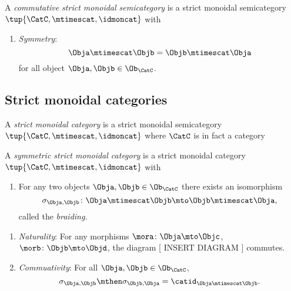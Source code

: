 {    \begin{ctdefinition}
        A \emph{commutative strict monoidal semicategory} is a strict monoidal semicategory  $\tup{\CatC, \mtimescat, \idmoncat}$ with

        \condit

        \begin{enumerate}
            \item \emph{Symmetry}:
                  \begin{equation}
                      \Obja \mtimescat \Objb = \Objb \mtimescat \Obja
                  \end{equation}
                  for all object $\Obja, \Objb \in \Ob_\CatC$.
        \end{enumerate}
    \end{ctdefinition}


    \subsection{Strict monoidal categories}

    \begin{ctdefinition}
        A \emph{strict monoidal category} is a strict monoidal semicategory $\tup{\CatC, \mtimescat, \idmoncat}$ where $\CatC$ is in fact a category
    \end{ctdefinition}

    \begin{ctdefinition}
        A \emph{symmetric strict monoidal category} is a strict monoidal category $\tup{\CatC, \mtimescat, \idmoncat}$ with

        \constit

        \begin{enumerate}
            \item For any two objects $\Obja, \Objb \in \Ob_\CatC$ there exists an isomorphism
                  \begin{equation}
                      \sigma_{\Obja, \Objb} \colon \Obja \mtimescat   \Objb \mto \Objb \mtimescat   \Obja,
                  \end{equation}
                  called the \emph{braiding}.
        \end{enumerate}

        \condit

        \begin{enumerate}
            \item \emph{Naturality}: For any morphisms $\mora \colon \Obja \mto \Objc$, $\morb \colon \Objb \mto \Objd$, the diagram
                      [ INSERT DIAGRAM ]
                  commutes.
            \item \emph{Commuativity}: For all $\Obja, \Objb \in \Ob_\CatC$,
                  \begin{equation}
                      \sigma_{\Obja, \Objb} \mthen \sigma_{\Objb, \Obja} = \catid_{\Obja \mtimescat   \Objb}.
                  \end{equation}
        \end{enumerate}


\end{ctdefinition}}
